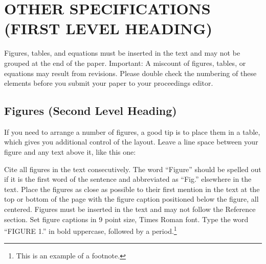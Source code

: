 \documentclass{aip-cp}
\begin{document}
\section{OTHER SPECIFICATIONS (FIRST LEVEL HEADING)}
Figures, tables, and equations must be inserted in the text and may not be grouped at the end of the paper. Important: A miscount of figures, tables, or equations may result from revisions. Please double check the numbering of these elements before you submit your paper to your proceedings editor.

\subsection{Figures (Second Level Heading)}
If you need to arrange a number of figures, a good tip is to place them in a table, which gives you additional control of the layout. Leave a line space between your figure and any text above it, like this one:



Cite all figures in the text consecutively. The word ``Figure'' should be spelled out if it is the first word of the sentence and abbreviated as ``Fig.'' elsewhere in the text. Place the figures as close as possible to their first mention in the text at the top or bottom of the page with the figure caption positioned below the figure, all centered. Figures must be inserted in the text and may not follow the Reference section. Set figure captions in 9 point size, Times Roman font. Type the word ``FIGURE 1.'' in bold uppercase, followed by a period.\footnote{This is an example of a footnote.}
\end{document}
